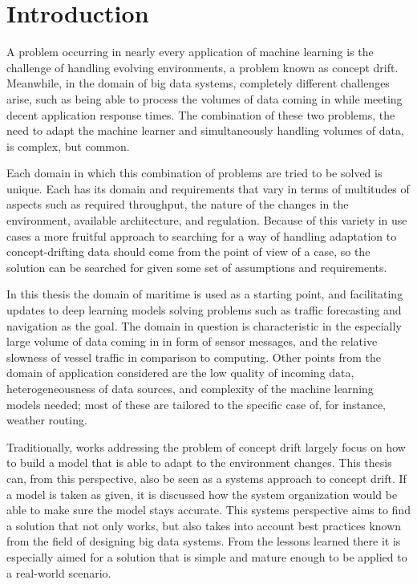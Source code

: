 \chapter{Introduction}
A problem occurring in nearly every application of machine learning is the challenge of handling evolving environments, a problem known as  concept drift. Meanwhile, in the domain of big data systems, completely different challenges arise, such as being able to process the volumes of data coming in while meeting decent application response times. The combination of these two problems, the need to adapt the machine learner and simultaneously handling volumes of data, is complex, but common.

Each domain in which this combination of problems are tried to be solved is unique. Each has its domain and requirements that vary in terms of multitudes of aspects such as required throughput, the nature of the changes in the environment, available architecture, and regulation.
Because of this variety in use cases a more fruitful approach to searching for a way of handling adaptation to concept-drifting data should come from the point of view of a case, so the solution can be searched for given some set of assumptions and requirements. 

In this thesis the domain of maritime is used as a starting point, and facilitating updates to deep learning models solving problems such as traffic forecasting and navigation as the goal. The domain in question is characteristic in the especially large volume of data coming in in form of sensor messages, and the relative slowness of vessel traffic in comparison to computing. Other points from the domain of application considered are the low quality of incoming data, heterogeneousness of data sources, and complexity of the machine learning models needed; most of these are tailored to the specific case of, for instance, weather routing.

Traditionally, works addressing the problem of concept drift largely focus on how to build a model that is able to adapt to the environment changes. This thesis can, from this perspective, also be seen as a systems approach to concept drift. If a model is taken as given, it is discussed how the system organization would be able to make sure the model stays accurate. This systems perspective aims to find a solution that not only works, but also takes into account best practices known from the field of designing big data systems. From the lessons learned there it is especially aimed for a solution that is simple and mature enough to be applied to a real-world scenario.

